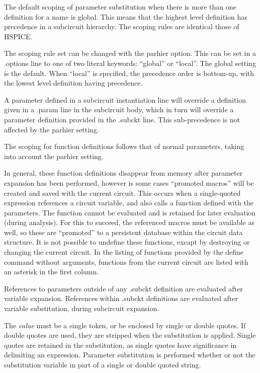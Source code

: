 The default scoping of parameter substitution when there is more than
one definition for a name is global.  This means that the highest
level definition has precedence in a subcircuit hierarchy.  The
scoping rules are identical those of HSPICE.

The scoping rule set can be changed with the {\vt parhier} option. 
This can be set in a {\vt .options} line to one of two literal
keywords:  ``{\vt global}'' or ``{\vt local}''.  The global setting is
the default.  When ``{\vt local}'' is specified, the precedence order
is bottom-up, with the lowest level definition having precedence.

A parameter defined in a subcircuit instantiation line will override a
definition given in a {\vt .param} line in the subcircuit body, which
in turn will override a parameter definition provided in the {\vt
.subckt} line.  This sub-precedence is not affected by the {\vt
parhier} setting.

The scoping for function definitions follows that of normal
parameters, taking into account the {\vt parhier} setting. 
 
In general, these function definitions disappear from memory after
parameter expansion has been performed, however is some cases
``promoted macros'' will be created and saved with the current
circuit.  This occurs when a single-quoted expression references a
circuit variable, and also calls a function defined with the
parameters.  The function cannot be evaluated and is retained for
later evaluation (during analysis).  For this to succeed, the
referenced macros must be available as well, so these are ``promoted''
to a persistent database within the circuit data structure.  It is not
possible to undefine these functions, excapt by destroying or changing
the current circuit.  In the listing of functions provided by the {\cb
define} command without arguments, functions from the current circuit
are listed with an asterisk in the first column.

References to parameters outside of any {\vt .subckt} definition are
evaluated after variable expansion.  References within {\vt .subckt}
definitions are evaluated after variable substitution, during
subcircuit expansion.

The {\it value} must be a single token, or be enclosed by single or
double quotes.  If double quotes are used, they are stripped when the
substitution is applied.  Single quotes are retained in the
substitution, as single quotes have significance in delimiting an
expression.  Parameter substitution is performed whether or not the
substitution variable in part of a single or double quoted string.

